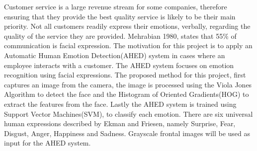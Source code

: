 
Customer service is a large revenue stream for some companies, therefore ensuring that they provide the best quality service is likely to be their main priority. Not all customers readily express their emotions, verbally, regarding the quality of the service they are provided. Mehrabian 1980, states that 55\% of communication is facial expression. The motivation for this project is to apply an Automatic Human Emotion Detection(AHED) system in cases where an employee interacts with a customer. The AHED system focuses on emotion recognition using facial expressions. The proposed method for this project, first captures an image from the camera, the image is processed using the Viola Jones Algorithm to detect the face and the Histogram of Oriented Gradients(HOG) to extract the features from the face. Lastly the AHED system is trained using Support Vector Machines(SVM), to classify each emotion. There are six universal human expressions described by Ekman and Friesen, namely Surprise, Fear, Disgust, Anger, Happiness and Sadness. Grayscale frontal images will be used as input for the AHED system.
